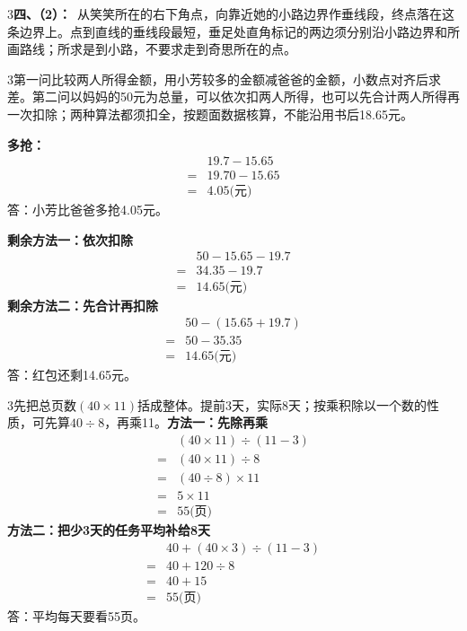 \documentclass[multi=snippet,border={5bp 20bp 5bp 5bp}]{standalone}
\newenvironment{snippet}[3]{\begin{minipage}{#1bp}\color{answerred}\fontsize{#2}{#3}\selectfont\raggedright}{\end{minipage}}
\begin{document}
\begin{snippet}{505}{11.5}{14}\begin{multicols}{3}\raggedcolumns \textbf{四、（2）：}\ 从笑笑所在的右下角点，向靠近她的小路边界作垂线段，终点落在这条边界上。点到直线的垂线段最短，垂足处直角标记的两边须分别沿小路边界和所画路线；所求是到小路，不要求走到奇思所在的点。\end{multicols}\end{snippet}
\begin{snippet}{505}{11.5}{14}\begin{multicols}{3}\raggedcolumns 第一问比较两人所得金额，用小芳较多的金额减爸爸的金额，小数点对齐后求差。第二问以妈妈的50元为总量，可以依次扣两人所得，也可以先合计两人所得再一次扣除；两种算法都须扣全，按题面数据核算，不能沿用书后18.65元。\par \textbf{多抢：}\[\begin{aligned} &19.7-15.65\\={}&19.70-15.65\\={}&4.05\text{(元)}\end{aligned}\]答：小芳比爸爸多抢4.05元。\par \textbf{剩余方法一：依次扣除}\[\begin{aligned} &50-15.65-19.7\\={}&34.35-19.7\\={}&14.65\text{(元)}\end{aligned}\]\textbf{剩余方法二：先合计再扣除}\[\begin{aligned} &50-(15.65+19.7)\\={}&50-35.35\\={}&14.65\text{(元)}\end{aligned}\]答：红包还剩14.65元。\end{multicols}\end{snippet}
\begin{snippet}{505}{11.5}{14}\begin{multicols}{3}\raggedcolumns 先把总页数\((40\times11)\)\allowbreak 括成整体。提前3天，实际8天；按乘积除以一个数的性质，可先算\(40\div8\)\allowbreak ，再乘11。\textbf{方法一：先除再乘}\[\begin{aligned}&(40\times11)\div(11-3)\\={}&(40\times11)\div8\\={}&(40\div8)\times11\\={}&5\times11\\={}&55\text{(页)}\end{aligned}\]\textbf{方法二：把少3天的任务平均补给8天}\[\begin{aligned}&40+(40\times3)\div(11-3)\\={}&40+120\div8\\={}&40+15\\={}&55\text{(页)}\end{aligned}\]答：平均每天要看55页。\end{multicols}\end{snippet}
\end{document}
